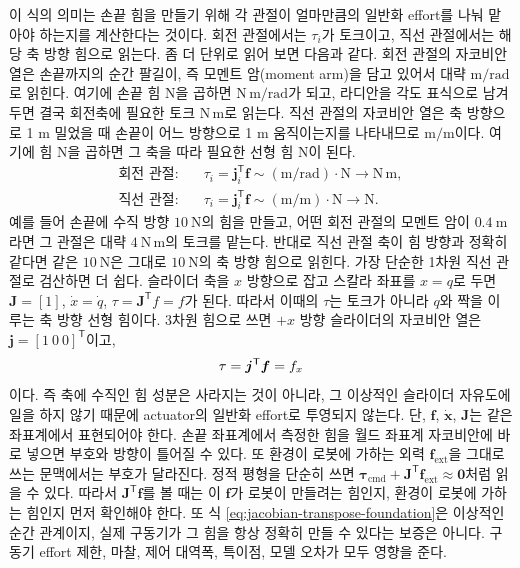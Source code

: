 이 식의 의미는 손끝 힘을 만들기 위해 각 관절이 얼마만큼의 일반화 effort를 나눠 맡아야 하는지를 계산한다는 것이다.
%
회전 관절에서는 \(\tau_i\)가 토크이고, 직선 관절에서는 해당 축 방향 힘으로 읽는다.
좀 더 단위로 읽어 보면 다음과 같다.
회전 관절의 자코비안 열은 손끝까지의 순간 팔길이, 즉 모멘트 암(moment arm)을 담고 있어서 대략 \(\mathrm{m/rad}\)로 읽힌다.
여기에 손끝 힘 \(\mathrm{N}\)을 곱하면 \(\mathrm{N\,m/rad}\)가 되고, 라디안을 각도 표식으로 남겨 두면 결국 회전축에 필요한 토크 \(\mathrm{N\,m}\)로 읽는다.
직선 관절의 자코비안 열은 축 방향으로 1 m 밀었을 때 손끝이 어느 방향으로 1 m 움직이는지를 나타내므로 \(\mathrm{m/m}\)이다.
여기에 힘 \(\mathrm{N}\)을 곱하면 그 축을 따라 필요한 선형 힘 \(\mathrm{N}\)이 된다.
\begin{equation}
  \begin{aligned}
    \text{회전 관절:}\quad
    &\tau_i
    =
    \bm{j}_i^{\mathsf{T}}\bm{f}
    \sim
    (\mathrm{m/rad})\cdot\mathrm{N}
    \rightarrow
    \mathrm{N\,m},
    \\
    \text{직선 관절:}\quad
    &\tau_i
    =
    \bm{j}_i^{\mathsf{T}}\bm{f}
    \sim
    (\mathrm{m/m})\cdot\mathrm{N}
    \rightarrow
    \mathrm{N}.
  \end{aligned}
  \label{eq:joint-effort-unit-check}
\end{equation}
예를 들어 손끝에 수직 방향 \(10~\mathrm{N}\)의 힘을 만들고, 어떤 회전 관절의 모멘트 암이 \(0.4~\mathrm{m}\)라면 그 관절은 대략 \(4~\mathrm{N\,m}\)의 토크를 맡는다.
반대로 직선 관절 축이 힘 방향과 정확히 같다면 같은 \(10~\mathrm{N}\)은 그대로 \(10~\mathrm{N}\)의 축 방향 힘으로 읽힌다.
가장 단순한 1차원 직선 관절로 검산하면 더 쉽다.
%
슬라이더 축을 \(x\) 방향으로 잡고 스칼라 좌표를 \(x=q\)로 두면 \(\bm{J}=[1]\), \(\dot{x}=\dot{q}\), \(\tau=\bm{J}^{\mathsf{T}}f=f\)가 된다.
%
%
%
따라서 이때의 \(\tau\)는 토크가 아니라 \(q\)와 짝을 이루는 축 방향 선형 힘이다.
3차원 힘으로 쓰면 \(+x\) 방향 슬라이더의 자코비안 열은 \(\bm{j}=[1\ 0\ 0]^{\mathsf{T}}\)이고,
%
\[
  \tau
  =
  \bm{j}^{\mathsf{T}}\bm{f}
  =
  f_x
\vmark{prism-projection-fx}%
\]
이다.
즉 축에 수직인 힘 성분은 사라지는 것이 아니라, 그 이상적인 슬라이더 자유도에 일을 하지 않기 때문에 actuator의 일반화 effort로 투영되지 않는다.
%
단, \(\bm{f}\), \(\dot{\bm{x}}\), \(\bm{J}\)는 같은 좌표계에서 표현되어야 한다.
손끝 좌표계에서 측정한 힘을 월드 좌표계 자코비안에 바로 넣으면 부호와 방향이 틀어질 수 있다.
또 환경이 로봇에 가하는 외력 \(\bm{f}_{\mathrm{ext}}\)을 그대로 쓰는 문맥에서는 부호가 달라진다.
정적 평형을 단순히 쓰면 \(\bm{\tau}_{\mathrm{cmd}}+\bm{J}^{\mathsf{T}}\bm{f}_{\mathrm{ext}}\approx\bm{0}\)처럼 읽을 수 있다.
따라서 \(\bm{J}^{\mathsf{T}}\bm{f}\)를 볼 때는 이 \(\bm{f}\)가 로봇이 만들려는 힘인지, 환경이 로봇에 가하는 힘인지 먼저 확인해야 한다.
또 식 \eqref{eq:jacobian-transpose-foundation}은 이상적인 순간 관계이지, 실제 구동기가 그 힘을 항상 정확히 만들 수 있다는 보증은 아니다.
구동기 effort 제한, 마찰, 제어 대역폭, 특이점, 모델 오차가 모두 영향을 준다.
%

